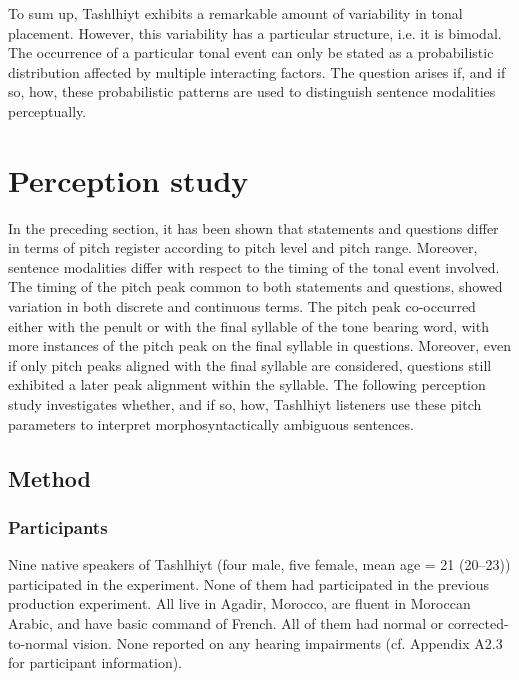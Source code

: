 To sum up, Tashlhiyt exhibits a remarkable amount of variability in tonal placement. However, this variability has a particular structure, i.e. it is bimodal. The occurrence of a particular tonal event can only be stated as a probabilistic distribution affected by multiple interacting factors. The question arises if, and if so, how, these probabilistic patterns are used to distinguish sentence modalities perceptually.

\section{Perception study}\label{sec:5.6}
In the preceding section, it has been shown that statements and questions differ in terms of pitch register according to pitch level and pitch range. Moreover, sentence modalities differ with respect to the timing of the tonal event involved. The timing of the pitch peak common to both statements and questions, showed variation in both discrete and continuous terms. The pitch peak co-occurred either with the penult or with the final syllable of the tone bearing word, with more instances of the pitch peak on the final syllable in questions. Moreover, even if only pitch peaks aligned with the final syllable are considered, questions still exhibited a later peak alignment within the syllable. The following perception study investigates whether, and if so, how, Tashlhiyt listeners use these pitch parameters to interpret morphosyntactically ambiguous sentences.

\subsection{Method}
\subsubsection{Participants}
Nine native speakers of Tashlhiyt (four male, five female, mean age = 21 (20--23)) participated in the experiment. None of them had participated in the previous production experiment. All live in Agadir, Morocco, are fluent in Moroccan Arabic, and have basic command of French. All of them had normal or corrected-to-normal vision. None reported on any hearing impairments (cf. Appendix A2.3 for participant information).

